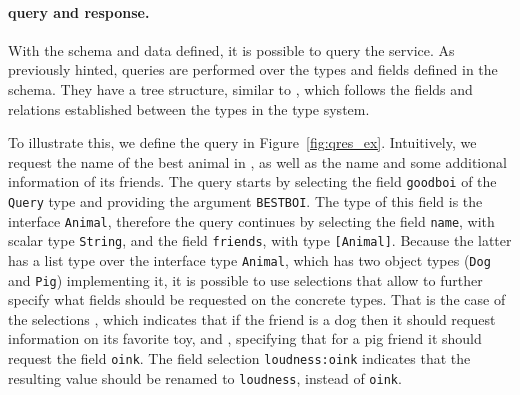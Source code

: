 


\paragraph{\gql query and response.}

With the schema and data defined, it is possible to query the service. 
As previously hinted, \gql queries are performed over the types and fields defined in the schema.
They have a tree structure, similar to \json, which follows the fields and relations established between the types
in the type system.

To illustrate this, we define the query in Figure~\ref{fig:qres_ex}. Intuitively, we request the name of the best animal in \goodbois, as well as 
the name and some additional information of its friends. The query starts by selecting the field \texttt{goodboi} of the \texttt{Query} type
and providing the argument \texttt{BESTBOI}. The type of this field is the interface \texttt{Animal}, therefore the query continues by selecting the field \texttt{name}, with scalar type \texttt{String}, 
and the field \texttt{friends}, with type \texttt{[Animal]}. 
Because the latter has a list type over the interface type \texttt{Animal}, which has two object types (\texttt{Dog} and \texttt{Pig}) implementing it, it is possible 
to use selections that allow to further specify what fields should be requested on the concrete types. 
That is the case of the selections , which indicates that if the friend is a dog then it should request information on its favorite toy, and 
, specifying that for a pig friend it should request the field \texttt{oink}. The field selection \texttt{loudness:oink} indicates that the resulting value should be renamed 
to \texttt{loudness}, instead of \texttt{oink}.

